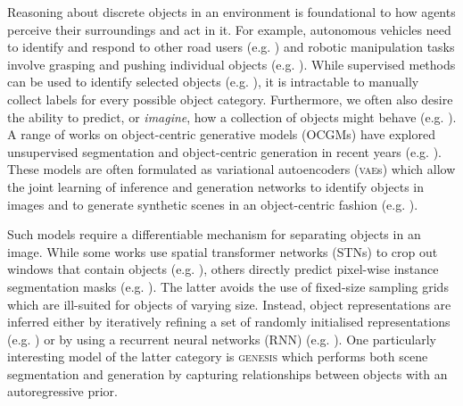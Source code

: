 \documentclass{article}
\begin{document}
Reasoning about discrete objects in an environment is foundational to how agents perceive their surroundings and act in it.
For example, autonomous vehicles need to identify and respond to other road users (e.g. \cite{geiger2012are,cordts2016Cityscapes}) and robotic manipulation tasks involve grasping and pushing individual objects (e.g. \cite{devin2018deep}).
While supervised methods can be used to identify selected objects (e.g. \cite{ren2015faster,he2017mask}), it is intractable to manually collect labels for every possible object category.
Furthermore, we often also desire the ability to predict, or \emph{imagine}, how a collection of objects might behave (e.g. \cite{wu2021greedy}).
A range of works on object-centric generative models (OCGMs) have explored unsupervised segmentation and object-centric generation in recent years (e.g. \cite{huang2015efficient,eslami2016attend,xu2018multi,crawford2019spatially,lin2020space,kosiorek2018sqair,jiang2020scalor,burgess2019monet,engelcke2020genesis,engelcke2020reconstruction,greff2016tagger,greff2017neural,van2018relational,greff2019multi,veerapaneni2020entity,locatello2020object,kosiorek2019stacked,yang2020learning,bear2020learning,anciukevicius2020object,van2018case,chen2019unsupervised,bielski2019emergence,arandjelovic2019object,azadi2019compositional,nguyen2020blockgan,ehrhardt2020relate,niemeyer2020giraffe}).
These models are often formulated as variational autoencoders (\textsc{vae}s) \cite{kingma2013auto,rezende2014stochastic} which allow the joint learning of inference and generation networks to identify objects in images and to generate synthetic scenes in an object-centric fashion (e.g. \cite{engelcke2020genesis,anciukevicius2020object}).

Such models require a differentiable mechanism for separating objects in an image.
While some works use spatial transformer networks (STNs) \cite{jaderberg2015spatial} to crop out windows that contain objects (e.g. \cite{huang2015efficient,eslami2016attend,kosiorek2018sqair,xu2018multi,crawford2019spatially,lin2020space,jiang2020scalor}), others directly predict pixel-wise instance segmentation masks (e.g. \cite{greff2016tagger,greff2017neural,van2018relational,burgess2019monet,engelcke2020genesis,engelcke2020reconstruction,veerapaneni2020entity,greff2019multi,locatello2020object}).
The latter avoids the use of fixed-size sampling grids which are ill-suited for objects of varying size.
Instead, object representations are inferred either by iteratively refining a set of randomly initialised representations (e.g. \cite{greff2016tagger,greff2017neural,van2018relational,greff2019multi,veerapaneni2020entity,locatello2020object}) or by using a recurrent neural networks (RNN) (e.g. \cite{burgess2019monet,engelcke2020genesis,engelcke2020reconstruction}).
One particularly interesting model of the latter category is \textsc{genesis} \cite{engelcke2020genesis} which performs both scene segmentation and generation by capturing relationships between objects with an autoregressive prior.
\end{document}
